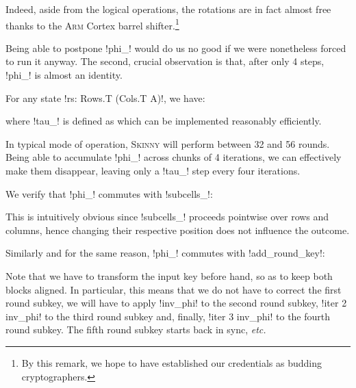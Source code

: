 \documentclass[draft,english]{jflart}
\newcommand{\etc}{\textit{etc.}}
\newcommand{\Skinny}{\textsc{Skinny}}
\begin{document}
Indeed, aside from the logical operations, the rotations are in fact
almost free thanks to the \textsc{Arm} Cortex barrel
shifter.\footnote{By this remark, we hope to have established our
credentials as budding cryptographers.}


Being able to postpone \coqe!phi_! would do us no good if we were
nonetheless forced to run it anyway. The second, crucial observation
is that, after only 4 steps, \coqe!phi_! is almost an identity.

\begin{prop}
  For any state \coqe!rs: Rows.T (Cols.T A)!, we have:

  where \coqe!tau_! is defined as
  which can be implemented reasonably efficiently.
\end{prop}

In typical mode of operation, \Skinny{} will perform between 32 and 56
rounds. Being able to accumulate \coqe!phi_! across chunks of 4
iterations, we can effectively make them disappear, leaving only a
\coqe!tau_! step every four iterations.


We verify that \coqe!phi_! commutes with \coqe!subcells_!:
%
\begin{prop}
\end{prop}

This is intuitively obvious since \coqe!subcells_! proceeds pointwise
over rows and columns, hence changing their respective position does
not influence the outcome.


Similarly and for the same reason, \coqe!phi_! commutes with
\coqe!add_round_key!:
%
\begin{prop}
\end{prop}

Note that we have to transform the input key before hand, so as to
keep both blocks aligned. In particular, this means that we do not
have to correct the first round subkey, we will have to apply
\coqe!inv_phi! to the second round subkey, \coqe!iter 2 inv_phi! to
the third round subkey and, finally, \coqe!iter 3 inv_phi! to the
fourth round subkey. The fifth round subkey starts back in sync,
\etc{}
\end{document}
